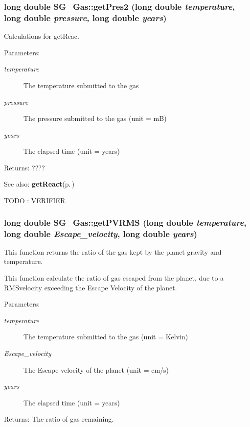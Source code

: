 \subsubsection{\setlength{\rightskip}{0pt plus 5cm}long double SG\_\-Gas::get\-Pres2 (long double {\em temperature}, long double {\em pressure}, long double {\em years})\hspace{0.3cm}{\tt  [protected]}}\label{class_s_g___gas_b0}


Calculations for get\-Reac. 

\begin{Desc}
\item[Parameters:]
\begin{description}
\item[{\em temperature}]The temperature submitted to the gas \item[{\em pressure}]The pressure submitted to the gas (unit = m\-B) \item[{\em years}]The elapsed time (unit = years) \end{description}
\end{Desc}
\begin{Desc}
\item[Returns:]???? \end{Desc}
\begin{Desc}
\item[See also:]{\bf get\-React}{\rm (p.\,\pageref{class_s_g___gas_a8})}\end{Desc}


TODO : VERIFIER 
\subsubsection{\setlength{\rightskip}{0pt plus 5cm}long double SG\_\-Gas::get\-PVRMS (long double {\em temperature}, long double {\em Escape\_\-velocity}, long double {\em years})}\label{class_s_g___gas_a9}


This function returns the ratio of the gas kept by the planet gravity and temperature. 

This function calculate the ratio of gas escaped from the planet, due to a RMSvelocity exceeding the Escape Velocity of the planet. \begin{Desc}
\item[Parameters:]
\begin{description}
\item[{\em temperature}]The temperature submitted to the gas (unit = Kelvin) \item[{\em Escape\_\-velocity}]The Escape velocity of the planet (unit = cm/s) \item[{\em years}]The elapsed time (unit = years) \end{description}
\end{Desc}
\begin{Desc}
\item[Returns:]The ratio of gas remaining. \end{Desc}
